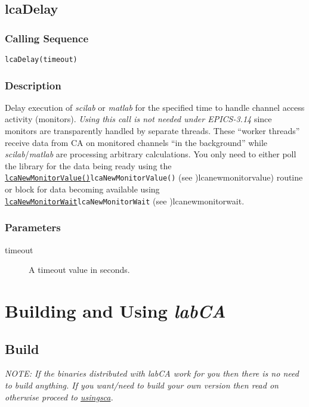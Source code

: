 \documentclass{article}
\newcommand{\sca}{\ita{labCA}}
\newcommand{\scilab}{\ita{scilab}}
\newcommand{\matlab}{\ita{matlab}}
\newcommand{\com}[1]{{\tt #1}}
\newcommand{\pbrk}{\pagebreak[3]}
\newcommand{\pbrkf}{\pagebreak}
\newcommand{\comref}[2]{\hyperref[ref]{\com{#1}}{\com{#1} (see }{)}{#2}}
\newcommand{\ita}[1]{\emph{#1}}
\renewcommand{\pbrk}{}
\renewcommand{\pbrkf}{}
\begin{document}
\vspace*{\fill}
\pbrk
\subsection{lcaDelay}
\label{lcadelay}
\subsubsection{Calling Sequence}
\begin{verbatim}
lcaDelay(timeout)
\end{verbatim}
\subsubsection{Description}
Delay execution of \scilab{} or \matlab{} for the specified time
to handle channel access activity (monitors). 
{\em Using this call is not needed under EPICS-3.14} since monitors
are transparently handled by separate threads. These ``worker threads''
receive data from CA on monitored channels ``in the background'' while
\scilab{}/\matlab{} are processing arbitrary calculations.
You only need to either poll the library for the data being ready using the
\comref{lcaNewMonitorValue()}{lcanewmonitorvalue}) routine
or block for data becoming available using
\comref{lcaNewMonitorWait}{lcanewmonitorwait}.

\subsubsection{Parameters}
\begin{description}
\item[timeout]
A timeout value in seconds.
\end{description}

\pbrkf
\section{Building and Using \sca{}}
\subsection{Build}
{\em NOTE: If the binaries distributed with \sca{} work for you then there is
no need to build anything. If you want/need to build your own version then read on
otherwise proceed to \hyperref{Using \sca}{Subsection~}{}{usingsca}.}
\end{document}
